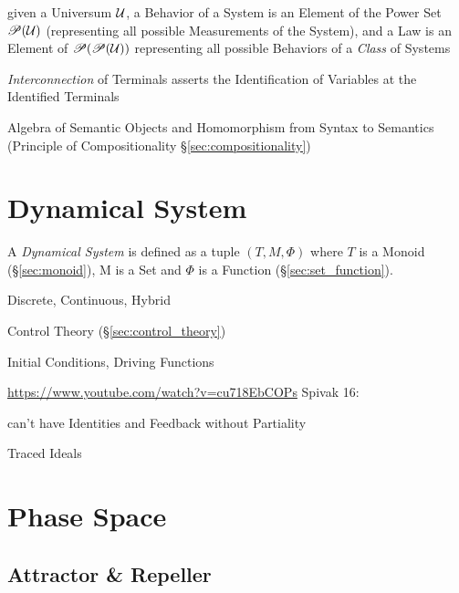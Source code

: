given a Universum $\mathcal{U}$, a Behavior of a System is an Element
of the Power Set $\mathscr{P}(\mathcal{U})$ (representing all possible
Measurements of the System), and a Law is an Element of
$\mathscr{P}(\mathscr{P}(\mathcal{U}))$ representing all possible Behaviors of a
\emph{Class} of Systems

\emph{Interconnection} of Terminals asserts the Identification of
Variables at the Identified Terminals

Algebra of Semantic Objects and Homomorphism from Syntax to Semantics
(Principle of Compositionality \S\ref{sec:compositionality})



\section{Dynamical System}\label{sec:dynamical_system}

A \emph{Dynamical System} is defined as a tuple $(T,M,\Phi)$ where $T$
is a Monoid (\S\ref{sec:monoid}), M is a Set and $\Phi$ is a Function
(\S\ref{sec:set_function}).

Discrete, Continuous, Hybrid

Control Theory (\S\ref{sec:control_theory})

Initial Conditions, Driving Functions


\url{https://www.youtube.com/watch?v=cu718EbCOPs} Spivak 16:

can't have Identities and Feedback without Partiality %

Traced Ideals %



\section{Phase Space}\label{sec:phase_space}

\subsection{Attractor \& Repeller}\label{sec:attractor_repeller}



